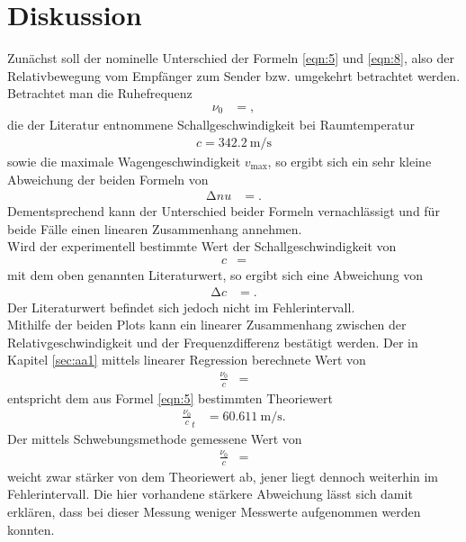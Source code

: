 \section{Diskussion}
\label{sec:Diskussion}
Zunächst soll der nominelle Unterschied der Formeln \ref{eqn:5} und \ref{eqn:8}, also der Relativbewegung vom Empfänger zum Sender bzw. umgekehrt betrachtet werden.
Betrachtet man die Ruhefrequenz
\begin{align*}
  \nu_0 &= ,
\end{align*}
die der Literatur \cite{bla} entnommene Schallgeschwindigkeit bei Raumtemperatur
\begin{align*}
  c = \SI{342.2}{\metre\per\second}
\end{align*}
sowie die maximale Wagengeschwindigkeit $v_{\text{max}}$, so ergibt sich ein sehr kleine Abweichung der beiden Formeln von
\begin{align*}
  \increment{nu} &= .
\end{align*}
Dementsprechend kann der Unterschied beider Formeln vernachlässigt und für beide Fälle einen linearen Zusammenhang annehmen.\\
Wird der experimentell bestimmte Wert der Schallgeschwindigkeit von
\begin{align*}
  c &= 
\end{align*}
mit dem oben genannten Literaturwert, so ergibt sich eine Abweichung von
\begin{align*}
  \increment{c} &= .
\end{align*}
Der Literaturwert befindet sich jedoch nicht im Fehlerintervall.\\
Mithilfe der beiden Plots kann ein linearer Zusammenhang zwischen der Relativgeschwindigkeit und der Frequenzdifferenz bestätigt werden.
Der in Kapitel \ref{sec:aa1} mittels linearer Regression berechnete Wert von
\begin{align*}
  \frac{\nu_0}{c} &= 
\end{align*}
entspricht dem aus Formel \ref{eqn:5} bestimmten Theoriewert
\begin{align*}
  \frac{\nu_0}{c}_t &= \SI{60.611}{\metre\per\second}.
\end{align*}
Der mittels Schwebungsmethode gemessene Wert von
\begin{align*}
  \frac{\nu_0}{c} &= 
\end{align*}
weicht zwar stärker von dem Theoriewert ab, jener liegt dennoch weiterhin im Fehlerintervall.
Die hier vorhandene stärkere Abweichung lässt sich damit erklären, dass bei dieser Messung weniger Messwerte aufgenommen werden konnten.
